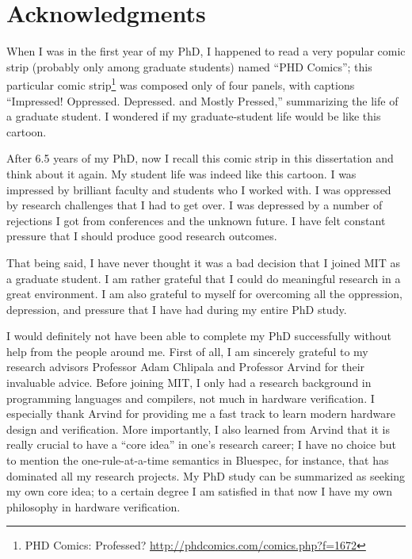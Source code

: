 % 

\cleardoublepage

\section*{Acknowledgments}

When I was in the first year of my PhD, I happened to read a very popular comic strip (probably only among graduate students) named ``PHD Comics''; this particular comic strip\footnote{PHD Comics: Professed? \url{http://phdcomics.com/comics.php?f=1672}} was composed only of four panels, with captions ``Impressed! Oppressed. Depressed. and Mostly Pressed,'' summarizing the life of a graduate student.
I wondered if my graduate-student life would be like this cartoon.

After 6.5 years of my PhD, now I recall this comic strip in this dissertation and think about it again.
My student life was indeed like this cartoon.
I was impressed by brilliant faculty and students who I worked with.
I was oppressed by research challenges that I had to get over.
I was depressed by a number of rejections I got from conferences and the unknown future.
I have felt constant pressure that I should produce good research outcomes.

That being said, I have never thought it was a bad decision that I joined MIT as a graduate student.
I am rather grateful that I could do meaningful research in a great environment.
I am also grateful to myself for overcoming all the oppression, depression, and pressure that I have had during my entire PhD study.

I would definitely not have been able to complete my PhD successfully without help from the people around me.
First of all, I am sincerely grateful to my research advisors Professor Adam Chlipala and Professor Arvind for their invaluable advice.
Before joining MIT, I only had a research background in programming languages and compilers, not much in hardware verification.
I especially thank Arvind for providing me a fast track to learn modern hardware design and verification.
More importantly, I also learned from Arvind that it is really crucial to have a ``core idea'' in one's research career; I have no choice but to mention the one-rule-at-a-time semantics in Bluespec, for instance, that has dominated all my research projects.
My PhD study can be summarized as seeking my own core idea; to a certain degree I am satisfied in that now I have my own philosophy in hardware verification.

